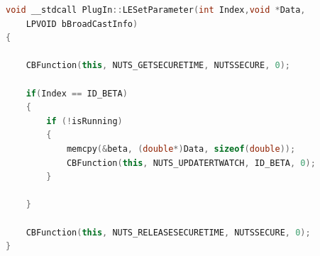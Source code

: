 \documentclass[12pt,a4paper,titlepage]{article}
\begin{document}
\begin{lstlisting}[language=cpp, label=code:set_rtwatch_fd, caption = Funzione \texttt{LESetParameter}, breaklines = false, captionpos = b]
void __stdcall PlugIn::LESetParameter(int Index,void *Data,
	LPVOID bBroadCastInfo)
{

	CBFunction(this, NUTS_GETSECURETIME, NUTSSECURE, 0);

	if(Index == ID_BETA)
	{
		if (!isRunning)
		{
			memcpy(&beta, (double*)Data, sizeof(double));
			CBFunction(this, NUTS_UPDATERTWATCH, ID_BETA, 0);
		}
		
	}

	CBFunction(this, NUTS_RELEASESECURETIME, NUTSSECURE, 0);
}
\end{lstlisting}
\clearpage

\nocite{*}
\printbibliography
\end{document}
